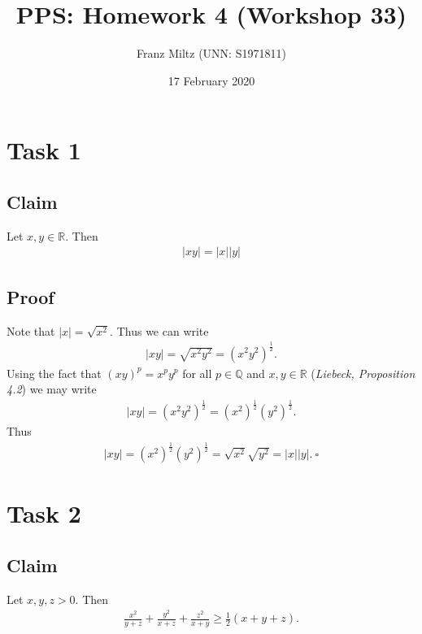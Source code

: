 \documentclass{article}
\title{PPS: Homework 4 (Workshop 33)}
\author{Franz Miltz (UNN: S1971811)}
\date{17 February 2020}
\begin{document}
\maketitle
\section*{Task 1}
\subsection*{Claim}
Let $x,y\in\mathbb{R}$. Then
\begin{align*}
  |xy|=|x||y|
\end{align*}
\subsection*{Proof}
Note that $|x|=\sqrt{x^2}$. Thus we can write
\begin{align*}
  |xy|=\sqrt{x^2y^2}=(x^2y^2)^\frac{1}{2}.
\end{align*}
Using the fact that $(xy)^p=x^py^p$ for all $p\in\mathbb{Q}$ and $x,y\in\mathbb{R}$ (\emph{Liebeck, Proposition 4.2}) we may write
\begin{align*}
  |xy|=(x^2y^2)^\frac{1}{2}=(x^2)^\frac{1}{2}(y^2)^\frac{1}{2}.
\end{align*}
Thus
\begin{align*}
  |xy|=(x^2)^\frac{1}{2}(y^2)^\frac{1}{2}=\sqrt{x^2}\sqrt{y^2}=|x||y|.\:\square
\end{align*}
\section*{Task 2}
\subsection*{Claim}
Let $x,y,z>0$. Then
\begin{align*}
  \frac{x^2}{y+z}+\frac{y^2}{x+z}+\frac{z^2}{x+y}\geq\frac{1}{2}(x+y+z).
\end{align*}
\end{document}
